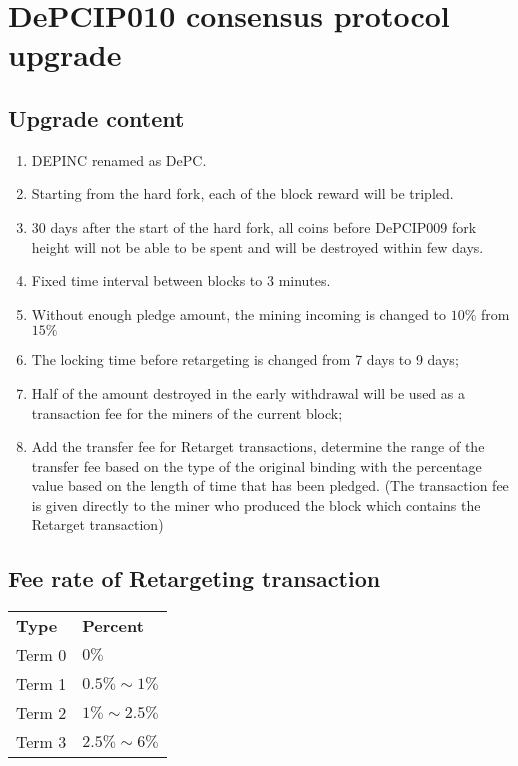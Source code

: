 \chapter{DePCIP010 consensus protocol upgrade}
\section{Upgrade content}
\begin{flushleft}
    \begin{enumerate}
        \item DEPINC renamed as DePC.
        \item Starting from the hard fork, each of the block reward will be tripled.
        \item 30 days after the start of the hard fork, all coins before DePCIP009 fork height will not be able to be spent and will be destroyed within few days.
        \item Fixed time interval between blocks to 3 minutes.
        \item Without enough pledge amount, the mining incoming is changed to $10\%$ from $15\%$
        \item The locking time before retargeting is changed from 7 days to 9 days;
        \item Half of the amount destroyed in the early withdrawal will be used as a transaction fee for the miners of the current block;
        \item Add the transfer fee for Retarget transactions, determine the range of the transfer fee based on the type of the original binding with the percentage value based on the length of time that has been pledged. (The transaction fee is given directly to the miner who produced the block which contains the Retarget transaction)
    \end{enumerate}
\end{flushleft}
\section{Fee rate of Retargeting transaction}
\begin{tabular}{ p{4cm} p{8cm} }
    \hline
    \textbf{Type}                  & \textbf{Percent}     \\[5pt]
    \rowcolor{lightgray!30}Term 0  & $0\%$                \\[5pt]
    Term 1                         & $0.5\%\sim1\%$       \\[5pt]
    \rowcolor{lightgray!30}Term 2  & $1\%\sim2.5\%$       \\[5pt]
    Term 3                         & $2.5\%\sim6\%$       \\[5pt]
    \hline
\end{tabular}